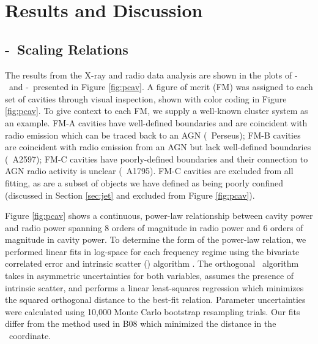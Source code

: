 \documentclass[12pt, preprint]{aastex}
\begin{document}
\section{Results and Discussion}
\label{sec:r&d}

\subsection{\pjet-\prad\ Scaling Relations}
\label{sec:relation}

The results from the X-ray and radio data analysis are shown in the
plots of \pcav-\phigh\ and \pcav-\plow\ presented in Figure
\ref{fig:pcav}. A figure of merit (FM) was assigned to each set of
cavities through visual inspection, shown with color coding in Figure
\ref{fig:pcav}. To give context to each FM, we supply a well-known
cluster system as an example. FM-A cavities have well-defined
boundaries and are coincident with radio emission which can be traced
back to an AGN (\eg\ Perseus); FM-B cavities are coincident with radio
emission from an AGN but lack well-defined boundaries (\eg\ A2597);
FM-C cavities have poorly-defined boundaries and their connection to
AGN radio activity is unclear (\eg\ A1795). FM-C cavities are excluded
from all fitting, as are a subset of objects we have defined as being
poorly confined (discussed in Section \ref{sec:jet} and excluded from
Figure \ref{fig:pcav}).

Figure \ref{fig:pcav} shows a continuous, power-law relationship
between cavity power and radio power spanning 8 orders of magnitude in
radio power and 6 orders of magnitude in cavity power. To determine
the form of the power-law relation, we performed linear fits in
log-space for each frequency regime using the bivariate correlated
error and intrinsic scatter (\bces) algorithm \citep{bces}. The
orthogonal \bces\ algorithm takes in asymmetric uncertainties for both
variables, assumes the presence of intrinsic scatter, and performs a
linear least-squares regression which minimizes the squared orthogonal
distance to the best-fit relation. Parameter uncertainties were
calculated using 10,000 Monte Carlo bootstrap resampling trials. Our
fits differ from the method used in B08 which minimized the distance
in the \pcav\ coordinate.
\end{document}
